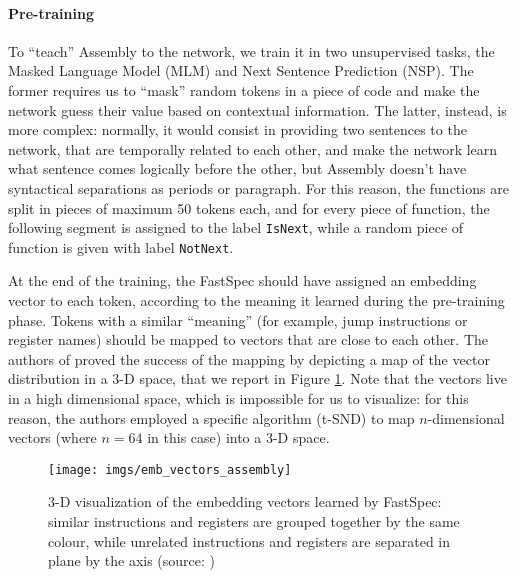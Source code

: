 \documentclass[target=mst,aauheader=aics]{thud}
\theoremstyle{definition}
\begin{document}
	\paragraph{Pre-training} To ``teach'' Assembly to the network, we train it in two unsupervised tasks, the Masked Language Model (MLM) and Next Sentence Prediction (NSP). The former requires us to ``mask'' random tokens in a piece of code and make the network guess their value based on contextual information. The latter, instead, is more complex: normally, it would consist in providing two sentences to the network, that are temporally related to each other, and make the network learn what sentence comes logically before the other, but Assembly doesn't have syntactical separations as periods or paragraph. For this reason, the functions are split in pieces of maximum 50 tokens each, and for every piece of function, the following segment is assigned to the label \texttt{IsNext}, while a random piece of function is given with label \texttt{NotNext}.
	
	At the end of the training, the FastSpec should have assigned an embedding vector to each token, according to the meaning it learned during the pre-training phase. Tokens with a similar ``meaning'' (for example, jump instructions or register names) should be mapped to vectors that are close to each other. The authors of \cite{Tol2021} proved the success of the mapping by depicting a map of the vector distribution in a 3-D space, that we report in Figure \ref{fig:emb_vec}. Note that the vectors live in a high dimensional space, which is impossible for us to visualize: for this reason, the authors employed a specific algorithm (t-SND) to map $n$-dimensional vectors (where $n = 64$ in this case) into a 3-D space.
	 
	\begin{figure}
		\centering
		\texttt{[image: imgs/emb\_vectors\_assembly]}
		\captionsetup{width=.7\linewidth}
		\caption{3-D visualization of the embedding vectors learned by FastSpec: similar instructions and registers are grouped together by the same colour, while unrelated instructions and registers are separated in plane by the axis (source: \cite{Tol2021})}
		\label{fig:emb_vec}
	\end{figure}
	
\end{document}
